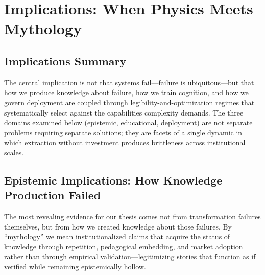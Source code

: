 \section{Implications: When Physics Meets Mythology}
\label{sec:implications}

%

\subsection*{Implications Summary}

The central implication is not that systems fail—failure is ubiquitous—but that how we produce knowledge about failure, how we train cognition, and how we govern deployment are coupled through legibility-and-optimization regimes that systematically select against the capabilities complexity demands. The three domains examined below (epistemic, educational, deployment) are not separate problems requiring separate solutions; they are facets of a single dynamic in which extraction without investment produces brittleness across institutional scales.

\subsection{Epistemic Implications: How Knowledge Production Failed}

The most revealing evidence for our thesis comes not from transformation failures themselves, but from how we created knowledge about those failures. By ``mythology'' we mean institutionalized claims that acquire the status of knowledge through repetition, pedagogical embedding, and market adoption rather than through empirical validation—legitimizing stories that function as if verified while remaining epistemically hollow.


